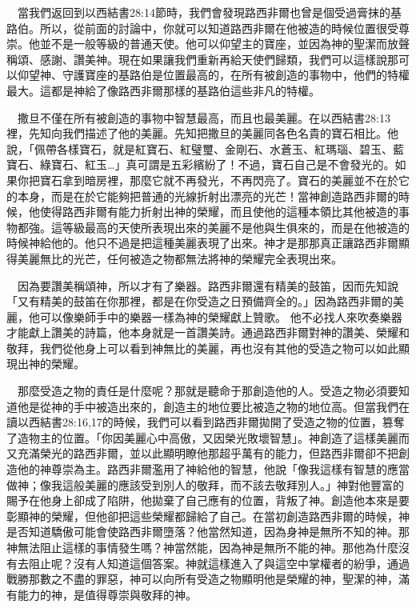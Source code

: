 \documentclass{book}
\begin{document}
　當我們返回到以西結書28:14節時，我們會發現路西非爾也曾是個受過膏抹的基路伯。所以，從前面的討論中，你就可以知道路西非爾在他被造的時候位置很受尊崇。他並不是一般等級的普通天使。他可以仰望主的寶座，並因為神的聖潔而放聲稱頌、感謝、讚美神。現在如果讓我們重新再給天使們歸類，我們可以這樣說那可以仰望神、守護寶座的基路伯是位置最高的，在所有被創造的事物中，他們的特權最大。這都是神給了像路西非爾那樣的基路伯這些非凡的特權。

　撒旦不僅在所有被創造的事物中智慧最高，而且也最美麗。在以西結書28:13裡，先知向我們描述了他的美麗。先知把撒旦的美麗同各色名貴的寶石相比。他說，「佩帶各樣寶石，就是紅寶石、紅璧璽、金剛石、水蒼玉、紅瑪瑙、碧玉、藍寶石、綠寶石、紅玉…」真可謂是五彩繽紛了！不過，寶石自己是不會發光的。如果你把寶石拿到暗房裡，那麼它就不再發光，不再閃亮了。寶石的美麗並不在於它的本身，而是在於它能夠把普通的光線折射出漂亮的光芒！當神創造路西非爾的時候，他使得路西非爾有能力折射出神的榮耀，而且使他的這種本領比其他被造的事物都強。這等級最高的天使所表現出來的美麗不是他與生俱來的，而是在他被造的時候神給他的。他只不過是把這種美麗表現了出來。神才是那那真正讓路西非爾顯得美麗無比的光芒，任何被造之物都無法將神的榮耀完全表現出來。

　因為要讚美稱頌神，所以才有了樂器。路西非爾還有精美的鼓笛，因而先知說「又有精美的鼓笛在你那裡，都是在你受造之日預備齊全的。」因為路西非爾的美麗，他可以像樂師手中的樂器一樣為神的榮耀獻上贊歌。 他不必找人來吹奏樂器才能獻上讚美的詩篇，他本身就是一首讚美詩。通過路西非爾對神的讚美、榮耀和敬拜，我們從他身上可以看到神無比的美麗，再也沒有其他的受造之物可以如此顯現出神的榮耀。

　那麼受造之物的責任是什麼呢？那就是聽命于那創造他的人。受造之物必須要知道他是從神的手中被造出來的，創造主的地位要比被造之物的地位高。但當我們在讀以西結書28:16,17的時候，我們可以看到路西非爾拋開了受造之物的位置，篡奪了造物主的位置。「你因美麗心中高傲，又因榮光敗壞智慧」。神創造了這樣美麗而又充滿榮光的路西非爾，並以此顯明瞭他那超乎萬有的能力，但路西非爾卻不把創造他的神尊崇為主。路西非爾濫用了神給他的智慧，他說「像我這樣有智慧的應當做神；像我這般美麗的應該受到別人的敬拜，而不該去敬拜別人。」神對他豐富的賜予在他身上卻成了陷阱，他拋棄了自己應有的位置，背叛了神。創造他本來是要彰顯神的榮耀，但他卻把這些榮耀都歸給了自己。在當初創造路西非爾的時候，神是否知道驕傲可能會使路西非爾墮落？他當然知道，因為身神是無所不知的神。那神無法阻止這樣的事情發生嗎？神當然能，因為神是無所不能的神。那他為什麼沒有去阻止呢？沒有人知道這個答案。神就這樣進入了與這空中掌權者的紛爭，通過戰勝那數之不盡的罪惡，神可以向所有受造之物顯明他是榮耀的神，聖潔的神，滿有能力的神，是值得尊崇與敬拜的神。
\end{document}
